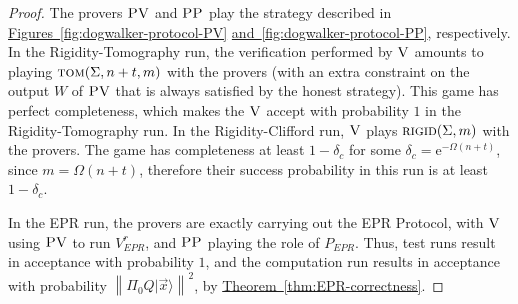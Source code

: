 \documentclass[11pt]{article}
\numberwithin{equation}{section}
\theoremstyle{definition}
\theoremstyle{plain}
\newcommand{\eee}{\mathrm e}
\newcommand{\expref}[2]{\hyperref[#2]{#1~\ref{#2}}}
\newcommand{\ket}[1]{|#1\rangle}
\newcommand{\norm}[1]{\left\|#1\right\|}
\newcommand{\rigid}{\textsc{rigid}}
\newcommand{\tom}{\textsc{tom}}
\newcommand{\ver}{\textsc{V}}
\newcommand{\pv}{\textsc{PV}}
\newcommand{\pp}{\textsc{PP}}
\begin{document}
\begin{proof}
The provers $\pv$ and $\pp$ play the strategy described in
\expref{Figures}{fig:dogwalker-protocol-PV} 
\expref{and}{fig:dogwalker-protocol-PP},
%
  respectively. In the Rigidity-Tomography run, the verification performed by
  $\ver$ amounts to playing $\tom(\Sigma,n+t,m)$ with the provers (with an extra
  constraint on the output $W$ of $\pv$ that is always satisfied by the honest
  strategy). This game has perfect
  completeness, which makes the $\ver$
  accept with probability $1$ in the Rigidity-Tomography run.
  In the Rigidity-Clifford run, $\ver$ plays $\rigid(\Sigma,m)$
  with the provers. The game
  has completeness at least $1-\delta_c$ for some $\delta_c=\eee^{-\Omega(n+t)}$,
  since $m=\Omega(n+t)$, therefore their success probability in this run is
  at least $1-\delta_c$.

In the EPR run, the provers are exactly carrying out the EPR Protocol, with $\ver$ using $\pv$ to run $V_{EPR}^r$, and $\pp$ playing the role of $P_{EPR}$. Thus, test runs result in acceptance with probability $1$, and the computation run results in acceptance with probability $\norm{\Pi_0 Q\ket{\vec{x}}}^2$, by \expref{Theorem}{thm:EPR-correctness}. 
\end{proof}

%
\newpage   %
\end{document}
